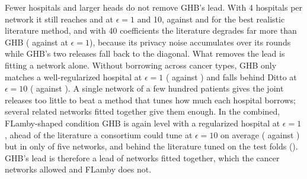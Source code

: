 \begin{table}[t]
\caption{When GHB leads: mean held-out log-loss relative to local estimation over the five held-out TCGA networks, under one change at a time (ten repetitions). Every method is rerun under each condition; the literature is re-tuned on the twelve design networks under the same condition (realistic: best of the six families on those networks) or on the test folds (oracle: best of the six families). Bold: the best method a consortium could run (local and oracle excluded).}
\label{tab:stress}
\scriptsize
\setlength{\tabcolsep}{3pt}
\end{table}

Fewer hospitals and larger heads do not remove GHB's lead. With 4 hospitals per network it still reaches \SimStressKFourOneGHB{} and \SimStressKFourTenGHB{} at $\epsilon=1$ and 10, against \SimStressKFourOneReal{} and \SimStressKFourTenReal{} for the best realistic literature method, and with 40 coefficients the literature degrades far more than GHB (\SimStressPFortyOneReal{} against \SimStressPFortyOneGHB{} at $\epsilon=1$), because its privacy noise accumulates over its rounds while GHB's two releases fall back to the diagonal. What removes the lead is fitting a network alone. Without borrowing across cancer types, GHB only matches a well-regularized hospital at $\epsilon=1$ (\SimStressAloneOneGHB{} against \SimStressAloneOneLocEB) and falls behind Ditto \cite{li2021ditto} at $\epsilon=10$ (\SimStressAloneTenGHB{} against \SimStressAloneTenReal). A single network of a few hundred patients gives the joint releases too little to beat a method that tunes how much each hospital borrows; several related networks fitted together give them enough. In the combined, FLamby-shaped condition GHB is again level with a regularized hospital at $\epsilon=1$, ahead of the literature a consortium could tune at $\epsilon=10$ on average (\SimStressFlambyTenGHB{} against \SimStressFlambyTenReal) but in only \SimStressFlambyTenWins{} of five networks, and behind the literature tuned on the test folds (\SimStressFlambyTenOrc). GHB's lead is therefore a lead of networks fitted together, which the cancer networks allowed and FLamby does not.


